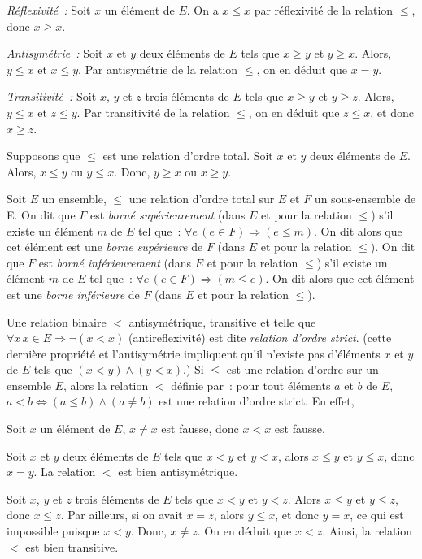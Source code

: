 \blank[medium]

\noindent{}
\startitemize[nowhite]
    \item \emph{Réflexivité :} Soit $x$ un élément de $E$. On a $x \leq x$ par réflexivité de la relation $\leq$, donc $x \geq x$. 
    \item \emph{Antisymétrie :} Soit $x$ et $y$ deux éléments de $E$ tels que $x \geq y$ et $y \geq x$.
        Alors, $y \leq x$ et $x \leq y$.
        Par antisymétrie de la relation $\leq$, on en déduit que $x = y$.
    \item \emph{Transitivité :} Soit $x$, $y$ et $z$ trois éléments de $E$ tels que $x \geq y$ et $y \geq z$.
        Alors, $y \leq x$ et $z \leq y$.
        Par transitivité de la relation $\leq$, on en déduit que $z \leq x$, et donc $x \geq z$.
    \item Supposons que $\leq$ est une relation d'ordre total.
        Soit $x$ et $y$ deux éléments de $E$. 
        Alors, $x \leq y$ ou $y \leq x$.
        Donc, $y \geq x$ ou $x \geq y$.
\stopitemize

\done

\blank[medium]

Soit $E$ un ensemble, $\leq$ une relation d'ordre total sur $E$ et $F$ un sous-ensemble de E. 
On dit que $F$ est \emph{borné supérieurement} (dans $E$ et pour la relation $\leq$) s'il existe un élément $m$ de $E$ tel que : $\forall e \, (e \in F) \Rightarrow (e \leq m)$. 
On dit alors que cet élément est une \emph{borne supérieure} de $F$ (dans $E$ et pour la relation $\leq$).
On dit que $F$ est \emph{borné inférieurement} (dans $E$ et pour la relation $\leq$) s'il existe un élément $m$ de $E$ tel que : $\forall e \, (e \in F) \Rightarrow (m \leq e)$.
On dit alors que cet élément est une \emph{borne inférieure} de $F$ (dans $E$ et pour la relation $\leq$).
 
Une relation binaire $<$ antisymétrique, transitive et telle que $\forall x \, x \in E \Rightarrow \lnot (x < x)$ (antireflexivité) est dite \emph{relation d'ordre strict}. 
(cette dernière propriété et l'antisymétrie impliquent qu'il n'existe pas d'éléments $x$ et $y$ de $E$ tels que $(x < y) \wedge (y < x)$.)
Si $\leq$ est une relation d'ordre sur un ensemble $E$, alors la relation $<$ définie par : pour tout éléments $a$ et $b$ de $E$, $a < b \Leftrightarrow (a \leq b) \wedge (a \neq b)$ est une relation d'ordre strict.
En effet, 
\startitemize[nowhite]
    \item Soit $x$ un élément de $E$, $x \neq x$ est fausse, donc $x < x$ est fausse. 
    \item Soit $x$ et $y$ deux éléments de $E$ tels que $x < y$ et $y < x$, alors $x \leq y$ et $y \leq x$, donc $x = y$. 
        La relation $<$ est bien antisymétrique. 
    \item Soit $x$, $y$ et $z$ trois éléments de $E$ tels que $x < y$ et $y < z$. 
        Alors $x \leq y$ et $y \leq z$, donc $x \leq z$. 
        Par ailleurs, si on avait $x=z$, alors $y \leq x$, et donc $y = x$, ce qui est impossible puisque $x < y$. 
        Donc, $x \neq z$. 
        On en déduit que $x < z$. 
        Ainsi, la relation $<$ est bien transitive.
\stopitemize

